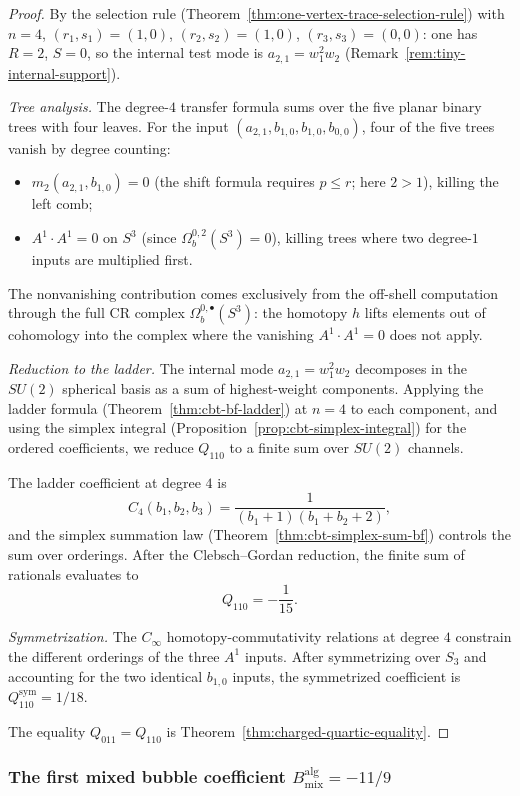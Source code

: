 \begin{proof}
By the selection rule (Theorem~\ref{thm:one-vertex-trace-selection-rule}) with $n=4$,
$(r_1,s_1)=(1,0)$, $(r_2,s_2)=(1,0)$, $(r_3,s_3)=(0,0)$: one has $R=2$, $S=0$, so the
internal test mode is $a_{2,1}=w_1^2w_2$ (Remark~\ref{rem:tiny-internal-support}).

\emph{Tree analysis.}
The degree-$4$ transfer formula sums over the five planar binary trees with four leaves.
For the input $(a_{2,1},b_{1,0},b_{1,0},b_{0,0})$, four of the five trees vanish by
degree counting:
\begin{itemize}[leftmargin=1.6em]
\item $m_2(a_{2,1},b_{1,0})=0$ (the shift formula requires $p\le r$; here $2>1$), killing
 the left comb;
\item $A^1\cdot A^1=0$ on $S^3$ (since $\Omega_b^{0,2}(S^3)=0$), killing trees where two
 degree-$1$ inputs are multiplied first.
\end{itemize}
The nonvanishing contribution comes exclusively from the off-shell computation through
the full CR complex $\Omega_b^{0,\bullet}(S^3)$: the homotopy $h$ lifts elements out
of cohomology into the complex where the vanishing $A^1\cdot A^1=0$ does not apply.

\emph{Reduction to the ladder.}
The internal mode $a_{2,1}=w_1^2 w_2$ decomposes in the $SU(2)$ spherical basis as a
sum of highest-weight components. Applying the ladder formula
(Theorem~\ref{thm:cbt-bf-ladder}) at $n=4$ to each component, and using the simplex
integral (Proposition~\ref{prop:cbt-simplex-integral}) for the ordered coefficients, we
reduce $Q_{110}$ to a finite sum over $SU(2)$ channels.

The ladder coefficient at degree $4$ is
\[
C_4(b_1,b_2,b_3)=\frac{1}{(b_1+1)(b_1+b_2+2)},
\]
and the simplex summation law (Theorem~\ref{thm:cbt-simplex-sum-bf}) controls the sum
over orderings. After the Clebsch--Gordan reduction, the finite sum of rationals
evaluates to
\[
Q_{110}=-\frac{1}{15}.
\]

\emph{Symmetrization.}
The $C_\infty$ homotopy-commutativity relations at degree $4$ constrain the different
orderings of the three $A^1$ inputs. After symmetrizing over $S_3$ and accounting for
the two identical $b_{1,0}$ inputs, the symmetrized coefficient is
$Q_{110}^{\mathrm{sym}}=1/18$.

The equality $Q_{011}=Q_{110}$ is Theorem~\ref{thm:charged-quartic-equality}.
\end{proof}

\subsubsection*{The first mixed bubble coefficient $B_{\mathrm{mix}}^{\mathrm{alg}}=-11/9$}

